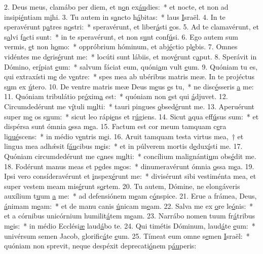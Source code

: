 2. Deus meus, clamábo per diem, et n\uline{o}n ex\uline{áu}dies:~* et nocte, et non ad insipi\uline{é}ntiam m\uline{i}hi.
3. Tu autem in s\uline{a}ncto h\uline{á}bitas:~* laus \uline{I}sraël.
4. In te speravérunt p\uline{a}tres n\uline{o}stri:~* speravérunt, et liber\uline{á}sti \uline{e}os.
5. Ad te clamavérunt, et s\uline{a}lvi f\uline{a}cti sunt:~* in te speravérunt, et non s\uline{u}nt conf\uline{ú}si.
6. Ego autem sum vermis, \uline{e}t non h\uline{o}mo:~* oppróbrium hóminum, et abj\uline{é}ctio pl\uline{e}bis.
7. Omnes vidéntes me d\uline{e}ris\uline{é}runt me:~* locúti sunt lábiis, et mov\uline{é}runt c\uline{a}put.
8. Sperávit in Dómino, er\uline{í}piat \uline{e}um:~* salvum fáciat eum, quóni\uline{a}m vult \uline{e}um.
9. Quóniam tu es, qui extraxísti m\uline{e} de v\uline{e}ntre:~* spes mea ab ubéribus matris meæ. In te projéctus s\uline{u}m ex \uline{ú}tero.
10. De ventre matris meæ Deus m\uline{e}us \uline{e}s tu,~* ne disc\uline{é}sseris \uline{a} me:
11. Quóniam tribulátio pr\uline{ó}xim\uline{a} est:~* quóniam non \uline{e}st qui \uline{á}djuvet.
12. Circumdedérunt me v\uline{í}tuli m\uline{u}lti:~* tauri pingues \uline{o}bsed\uline{é}runt me.
13. Aperuérunt super m\uline{e} os s\uline{u}um:~* sicut leo rápi\uline{e}ns et r\uline{ú}giens.
14. Sicut \uline{a}qua eff\uline{ú}sus sum:~* et dispérsa sunt ómnia \uline{o}ssa m\uline{e}a.
15. Factum est cor meum tamquam c\uline{e}ra li\uline{qué}scens:~* in médio v\uline{e}ntris m\uline{e}i.
16. Aruit tamquam testa virtus mea,~† et lingua mea adhǽsit f\uline{áu}cibus m\uline{e}is:~* et in púlverem mortis d\uline{e}dux\uline{í}sti me.
17. Quóniam circumdedérunt me c\uline{a}nes m\uline{u}lti:~* concílium malignánti\uline{u}m obs\uline{é}dit me.
18. Fodérunt manus meas et p\uline{e}des m\uline{e}os:~* dinumeravérunt ómnia \uline{o}ssa m\uline{e}a.
19. Ipsi vero consíderavérunt et \uline{i}nspex\uline{é}runt me:~* divisérunt sibi vestiménta mea, et super vestem meam mis\uline{é}runt s\uline{o}rtem.
20. Tu autem, Dómine, ne elongáveris auxílium t\uline{u}um \uline{a} me:~* ad defensiónem m\uline{e}am c\uline{ó}nspice.
21. Erue a frámea, Deus, \uline{á}nimam m\uline{e}am:~* et de manu canis \uline{ú}nicam m\uline{e}am.
22. Salva me ex \uline{o}re le\uline{ó}nis:~* et a córnibus unicórnium humilit\uline{á}tem m\uline{e}am.
23. Narrábo nomen tuum fr\uline{á}tribus m\uline{e}is:~* in médio Ecclési\uline{æ} laud\uline{á}bo te.
24. Qui timétis Dóminum, laud\uline{á}te \uline{e}um:~* univérsum semen Jacob, glorific\uline{á}te \uline{e}um.
25. Tímeat eum omne s\uline{e}men \uline{I}sraël:~* quóniam non sprevit, neque despéxit deprecati\uline{ó}nem p\uline{áu}peris:
